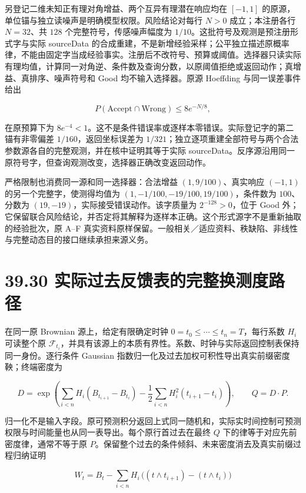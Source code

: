 \documentclass[
  11pt,
  oneside]{book}
\begin{document}
另登记二维未知正有理对角增益、两个互异有理潜在响应均在 \([-1,1]\) 的原源，单位锚与独立读噪声是明确模型权限。风险结论对每行 \(N>0\) 成立；本注册各行 \(N=32\)、共 \(128\) 个完整符号，传感噪声幅度为 \(1/10\)。这批符号及观测是预注册形式字与实际 sourceData 的合成重建，不是新增经验采样；公平独立描述原概率律，不能由固定字当成经验事实。注册后不改符号、预算或阈值。选择器只读实际有理均值，计算同一对角逆、条件数及查询分数，以原阈值拒绝或返回动作；真增益、真排序、噪声符号和 Good 均不输入选择器。原源 Hoeffding 与同一误差事件给出

\[P(\mathrm{Accept}\cap\mathrm{Wrong})\le 8e^{-N/8},\]

在原预算下为 \(8e^{-4}<1\)。这不是条件错误率或逐样本零错误。实际登记字的第二锚有非零偏差 \(1/160\)，返回坐标误差为 \(1/321\)；独立逐项重建全部符号与两个合法参数源各自的完整观测，并在核中证明其等于实际 sourceData。反序源沿用同一原符号字，但查询观测改变，选择器正确改变返回动作。

严格限制也消费同一源和同一选择器：合法增益 \((1,9/100)\)、真实响应 \((-1,1)\) 的另一个完整字，使测得均值为 \((1,-1/100,-19/100,19/100)\)，条件数为 \(100\)、分数为 \((19,-19)\)，实际接受错误动作。该字质量为 \(2^{-128}>0\)，位于 Good 外；它保留联合风险结论，并否定将其解释为逐样本正确。这个形式源字不是重新抽取的经验批次，原 A--F 真实资料原样保留。一般相关／适应资料、秩缺陷、非线性与完整动态目的接口继续承担来源义务。

\section{39.30 实际过去反馈表的完整换测度路径}\label{ux5b9eux9645ux8fc7ux53bbux53cdux9988ux8868ux7684ux5b8cux6574ux6362ux6d4bux5ea6ux8defux5f84}

在同一原 Brownian 源上，给定有限确定时钟 \(0=t_0\le\cdots\le t_n=T\)，每行系数 \(H_i\) 可读整个原 \(\mathcal F_{t_i}\)，并具有该源上的本质有界性。系数、时钟与实际返回控制表保持同一身份。逐行条件 Gaussian 指数归一化及过去加权可积性导出真实前缀密度鞅；终端密度为

\[D=\exp\!\left(\sum_{i<n}H_i(B_{t_{i+1}}-B_{t_i})
-\frac12\sum_{i<n}H_i^2(t_{i+1}-t_i)\right),\qquad Q=D\cdot P.\]

归一化不是输入字段。原可预测积分返回上式同一随机和，实际实时间控制可预测权限与时间能量也从同一表导出。每个原行首过去在最终 \(Q\) 下的律等于对应先前密度律，通常不等于原 \(P\)。保留整个过去的条件倾斜、未来密度消去及真实前缀过程归纳证明

\[W_t=B_t-\sum_{i<n}H_i\,\bigl((t\wedge t_{i+1})-(t\wedge t_i)\bigr)\]
\end{document}
